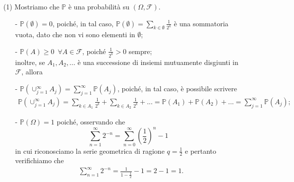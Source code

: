 \documentclass[12pt]{homework}
\begin{document}
  \begin{enumerate}
  \item[(1)]
  Mostriamo che $\mathbb{P}$ è una probabilità su $\left(\Omega,\mathcal{F}\right)$.
  \begin{itemize}
  \item[-]
  $\mathbb{P}\left(\emptyset\right)=0$, poiché, in tal caso, $\mathbb{P}\left(\emptyset\right)=\sum_{k\in \emptyset}\frac{1}{2^{k}}$ è una sommatoria vuota, dato che non vi sono elementi in $\emptyset$;
  \item[-]
  $\mathbb{P}\left(A\right)\geq 0 \,\,\,\forall A\in \mathcal{F}$, poiché $\frac{1}{2^{k}}> 0$ sempre;\\
  inoltre, se $A_{1},A_{2},...$ è una successione di insiemi mutuamente disgiunti in $\mathcal{F}$, allora 
  \item[-]
  $\mathbb{P}\left(\cup_{j=1}^{\infty}A_{j}\right)=\sum_{j=1}^{\infty}\mathbb{P}\left(A_{j}\right)$, poiché, in tal caso, è possibile scrivere
  \begin{align*}
\mathbb{P}\left(\cup_{j=1}^{\infty}A_{j}\right)=\sum_{k\in A_{1}}\frac{1}{2^{k}}+\sum_{k\in A_{2}}\frac{1}{2^{k}}+...=\mathbb{P}\left(A_{1}\right)+\mathbb{P}\left(A_{2}\right)+...=\sum_{j=1}^{\infty}\mathbb{P}\left(A_{j}\right);
\end{align*}   
\item[-]
$\mathbb{P}\left(\Omega\right)=1$ poiché, osservando che
\begin{equation*}
\sum_{n=1}^{\infty}2^{-n}=\sum_{n=0}^{\infty}\left(\frac{1}{2}\right)^{n}-1
\end{equation*}
in cui riconosciamo la serie geometrica di ragione $q= \frac{1}{2}$ e pertanto verifichiamo che
\begin{align*}
&\sum_{n=1}^{\infty}2^{-n}=\frac{1}{1-\frac{1}{2}} - 1= 2-1= 1.
\end{align*}
\end{itemize}



\end{enumerate}
\end{document}

